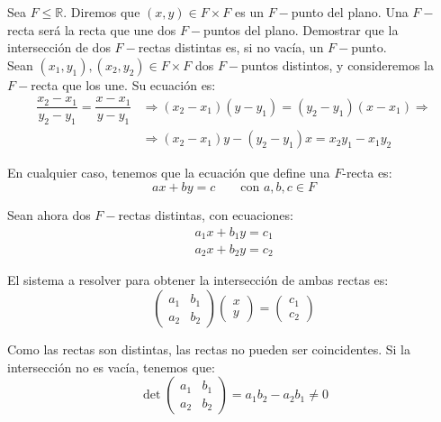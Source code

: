 \begin{ejercicio}\label{ej:intersecciones}
    Sea $F\leq \mathbb{R}$. Diremos que $(x,y)\in F\times F$ es un $F-$punto del plano. Una $F-$recta será la recta que une dos $F-$puntos del plano. Demostrar que la intersección de dos $F-$rectas distintas es, si no vacía, un $F-$punto.\\
    
    Sean $(x_1,y_1),(x_2,y_2)\in F\times F$ dos $F-$puntos distintos, y consideremos la $F-$recta que los une. Su ecuación es:
    \begin{align*}
        \dfrac{x_2-x_1}{y_2-y_1} = \dfrac{x-x_1}{y-y_1}
        &\Longrightarrow
        (x_2-x_1)(y-y_1) = (y_2-y_1)(x-x_1)
        \Longrightarrow\\&\Longrightarrow 
        (x_2-x_1)y - (y_2-y_1)x = x_2y_1 - x_1y_2
    \end{align*}

    En cualquier caso, tenemos que la ecuación que define una $F$-recta es:
    \begin{equation*}
        ax + by = c\qquad \text{con } a,b,c\in F
    \end{equation*}

    Sean ahora dos $F-$rectas distintas, con ecuaciones:
    \begin{align*}
        a_1x + b_1y = c_1 \\
        a_2x + b_2y = c_2
    \end{align*}

    El sistema a resolver para obtener la intersección de ambas rectas es:
    \begin{equation*}
        \begin{pmatrix}
            a_1 & b_1 \\
            a_2 & b_2
        \end{pmatrix}
        \begin{pmatrix}
            x \\
            y
        \end{pmatrix} = \begin{pmatrix}
            c_1 \\
            c_2
        \end{pmatrix}
    \end{equation*}

    Como las rectas son distintas, las rectas no pueden ser coincidentes. Si la intersección no es vacía, tenemos que:
    \begin{equation*}
        \det\begin{pmatrix}
            a_1 & b_1 \\
            a_2 & b_2
        \end{pmatrix} = a_1b_2 - a_2b_1 \neq 0
    \end{equation*}


\end{ejercicio}

